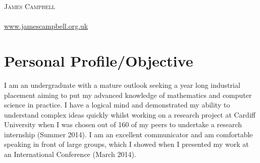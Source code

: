 \documentclass[a4paper]{article}
\begin{document}
\pagestyle{empty} %
\begin{multicols}{2}

\raggedright{\textsc{\Huge{James Campbell}}}\\
\columnbreak
{}\\
\url{www.jamescampbell.org.uk}

\end{multicols}
\section{Personal Profile/Objective}
I am an undergraduate with a mature outlook seeking a year long industrial placement aiming to put my advanced knowledge of mathematics and computer science in practice.
I have a logical mind and demonstrated my ability to understand complex ideas quickly whilst working on a research project at Cardiff University when I was chosen out of 160 of my peers to undertake a research internship (Summer 2014).
I am an excellent communicator and am comfortable speaking in front of large groups, which I showed when I presented my work at an International Conference (March 2014).

\end{document}
